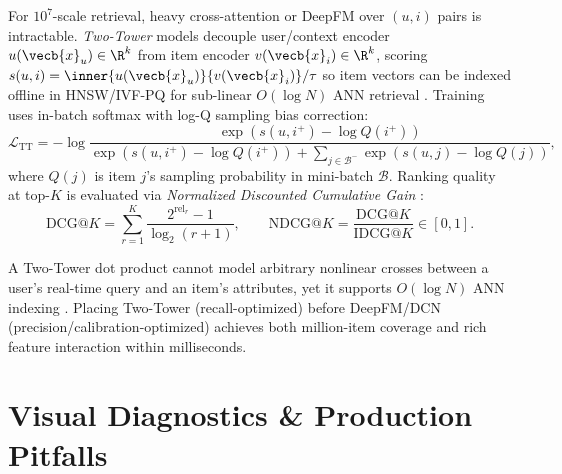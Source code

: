 \documentclass[../../../../master.tex]{subfiles}
\begin{document}
\begin{coremath}
For $10^7$-scale retrieval, heavy cross-attention or DeepFM over $(u, i)$ pairs is intractable. \emph{Two-Tower} models decouple user/context encoder $u(\vecb{x}_u) \in \R^k$ from item encoder $v(\vecb{x}_i) \in \R^k$, scoring $s(u,i) = \inner{u(\vecb{x}_u)}{v(\vecb{x}_i)}/\tau$ so item vectors can be indexed offline in HNSW/IVF-PQ for sub-linear $O(\log N)$ ANN retrieval . Training uses in-batch softmax with log-Q sampling bias correction:
\begin{equation}
  \mathcal{L}_{\mathrm{TT}} = -\log\frac{\exp(s(u, i^+) - \log Q(i^+))}{\exp(s(u, i^+) - \log Q(i^+)) + \sum_{j \in \mathcal{B}^-} \exp(s(u, j) - \log Q(j))},
\end{equation}
where $Q(j)$ is item $j$'s sampling probability in mini-batch $\mathcal{B}$. Ranking quality at top-$K$ is evaluated via \emph{Normalized Discounted Cumulative Gain} :
\begin{equation}
  \mathrm{DCG}@K = \sum_{r=1}^K \frac{2^{\mathrm{rel}_r} - 1}{\log_2(r + 1)}, \qquad \mathrm{NDCG}@K = \frac{\mathrm{DCG}@K}{\mathrm{IDCG}@K} \in [0, 1].
\end{equation}
\end{coremath}

\begin{intuition}
A Two-Tower dot product cannot model arbitrary nonlinear crosses between a user's real-time query and an item's attributes, yet it supports $O(\log N)$ ANN indexing . Placing Two-Tower (recall-optimized) before DeepFM/DCN (precision/calibration-optimized) achieves both million-item coverage and rich feature interaction within milliseconds.
\end{intuition}

\section{Visual Diagnostics \& Production Pitfalls}
\end{document}
